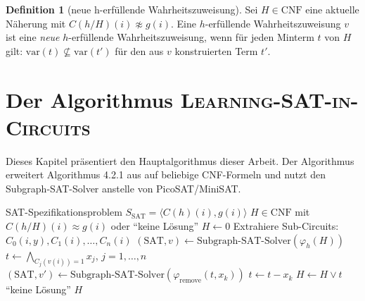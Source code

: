 ﻿\documentclass[a4paper,12pt]{article}
\theoremstyle{definition}
\newtheorem{definition}{Definition}
\begin{document}
\begin{definition}[neue h-erfüllende Wahrheitszuweisung]
    Sei $H \in \text{CNF}$ eine aktuelle Näherung mit $C(h/H)(i) \not\approx g(i)$. Eine $h$-erfüllende Wahrheitszuweisung $v$ ist eine \textit{neue} $h$-erfüllende Wahrheitszuweisung, wenn für jeden Minterm $t$ von $H$ gilt: $\text{var}(t) \not\subseteq \text{var}(t')$ für den aus $v$ konstruierten Term $t'$.
\end{definition}

\section{Der Algorithmus \textsc{Learning-SAT-in-Circuits}}

Dieses Kapitel präsentiert den Hauptalgorithmus dieser Arbeit. Der Algorithmus erweitert Algorithmus 4.2.1 aus \cite{Epp13} auf beliebige CNF-Formeln und nutzt den Subgraph-SAT-Solver anstelle von PicoSAT/MiniSAT.

\begin{algorithm}[h]
    \caption{\textsc{Learning-SAT-in-Circuits}}\label{alg:learning-sat}
    \begin{algorithmic}[1]
        \Require SAT-Spezifikationsproblem $S_{\text{SAT}} = \langle C(h)(i), g(i) \rangle$
        \Ensure $H \in \text{CNF}$ mit $C(h/H)(i) \approx g(i)$ oder ``keine Lösung''
        \State $H \gets 0$ 
        \State Extrahiere Sub-Circuits: $C_0(i,y), C_1(i), \ldots, C_n(i)$
         \label{line:equiv-check}
            \State $(\text{SAT}, v) \gets \text{Subgraph-SAT-Solver}(\varphi_h(H))$ \label{line:new-hsatisfying}
                \State $t \gets \bigwedge_{C_j(v(i))=1} x_j$, $j = 1, \ldots, n$ \label{line:build-term}
                 \label{line:reduce-loop}
                    \State $(\text{SAT}, v') \gets \text{Subgraph-SAT-Solver}(\varphi_{\text{remove}}(t, x_k))$
                        \State $t \gets t - x_k$ \label{line:remove-var}
                    \EndIf
                \EndFor
                \State $H \gets H \lor t$ \label{line:add-term}
            \Else
                \State \Return ``keine Lösung''
            \EndIf
        \EndWhile
        \State \Return $H$
    \end{algorithmic}
\end{algorithm}
\end{document}

